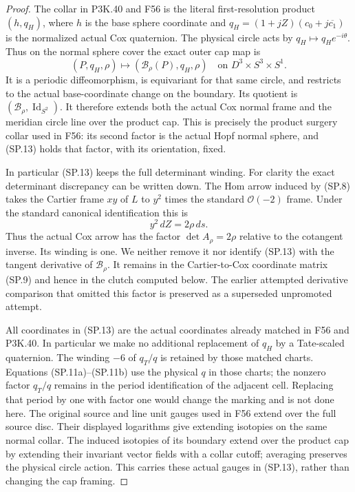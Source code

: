 \begin{proof}
The collar in P3K.40 and F56 is the literal first-resolution product
\((h,q_H)\), where \(h\) is the base sphere coordinate and
\(q_H=(1+jZ)(c_0+j\overline{c_1})\) is the normalized actual
Cox quaternion. The physical circle acts by
\(q_H\mapsto q_H e^{-i\theta}\). Thus on the normal sphere
cover the exact outer cap map is
\[
 (P,q_H,\rho)\longmapsto
                  (\mathcal B_\rho(P),q_H,\rho)
 \quad\text{on }D^3\times S^3\times S^1.                 \tag{SP.13}
\]
It is a periodic diffeomorphism, is equivariant for that same circle,
and restricts to the actual base-coordinate change on the boundary.
Its quotient is
\((\mathcal B_\rho,\operatorname{Id}_{S^2})\). It therefore
extends both the actual Cox normal frame and the meridian circle
line over the product cap. This is precisely the product surgery
collar used in F56: its second factor is the actual Hopf normal
sphere, and (SP.13) holds that factor, with its orientation, fixed.

In particular (SP.13) keeps the full determinant winding. For
clarity the exact determinant discrepancy can be written down.
The Hom arrow induced by (SP.8) takes the Cartier frame \(xy\)
of \(L\) to \(y^2\) times the standard \(\mathcal O(-2)\)
frame. Under the standard canonical identification this is
\[
                  y^2\,dZ=2\rho\,ds.                    \tag{SP.14}
\]
Thus the actual Cox arrow has the factor
\(\det A_\rho=2\rho\) relative to the cotangent inverse.
Its winding is one. We neither remove it nor identify (SP.13) with
the tangent derivative of \(\mathcal B_\rho\). It remains in
the Cartier-to-Cox coordinate matrix (SP.9) and hence in the clutch
computed below. The earlier attempted derivative comparison that
omitted this factor is preserved as a superseded unpromoted attempt.

All coordinates in (SP.13) are the actual coordinates already
matched in F56 and P3K.40. In particular we make no additional
replacement of \(q_H\) by a Tate-scaled quaternion. The winding
\(-6\) of \(q_T/q\) is retained by those matched charts.
Equations (SP.11a)--(SP.11b) use the physical \(q\) in those
charts; the nonzero factor \(q_T/q\) remains in the period
identification of the adjacent cell. Replacing that period by one
with factor one would change the marking and is not done here.
The original source and line unit gauges used in F56 extend over
the full source disc. Their displayed logarithms give extending
isotopies on the same normal collar. The induced isotopies of its
boundary extend over the product cap by extending their invariant
vector fields with a collar cutoff; averaging preserves the
physical circle action. This carries these actual gauges in
(SP.13), rather than changing the cap framing.


\end{proof}
